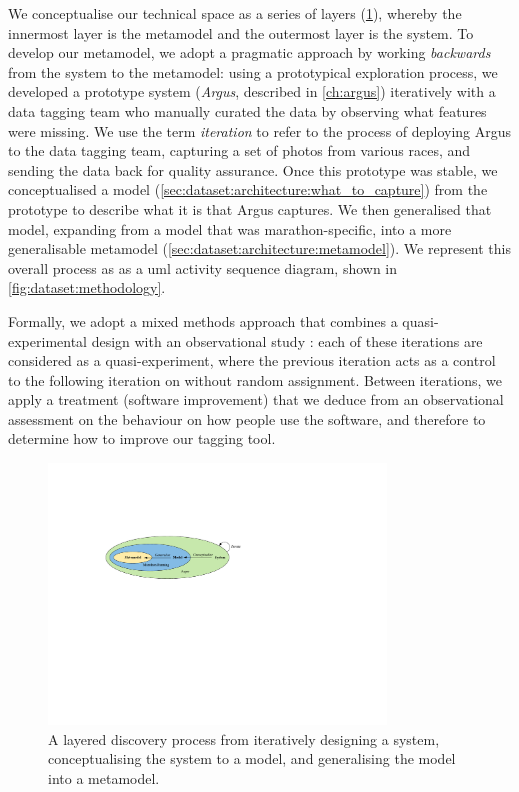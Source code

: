 We conceptualise our technical space as a series of layers (\cref{fig:dataset:layers}), whereby the innermost layer is the metamodel and the outermost layer is the system. To develop our metamodel, we adopt a pragmatic approach by working \textit{backwards} from the system to the metamodel: using a prototypical exploration process, we developed a prototype system (\textit{Argus}, described in \cref{ch:argus}) iteratively with a data tagging team who manually curated the data by observing what features were missing. We use the term \textit{iteration} to refer to the process of deploying Argus to the data tagging team, capturing a set of photos from various races, and sending the data back for quality assurance. Once this prototype was stable, we conceptualised a model (\cref{sec:dataset:architecture:what_to_capture}) from the prototype to describe what it is that Argus captures. We then generalised that model, expanding from a model that was marathon-specific, into a more generalisable metamodel (\cref{sec:dataset:architecture:metamodel}). We represent this overall process as as a \gls{uml} activity sequence diagram, shown in \cref{fig:dataset:methodology}.

Formally, we adopt a mixed methods approach that combines a quasi-experimental design with an observational study \citep{Trochim:2001wg,Gray:2013va}: each of these iterations are considered as a quasi-experiment, where the previous iteration acts as a control to the following iteration on without random assignment. Between iterations, we apply a treatment (software improvement) that we deduce from an observational assessment on the behaviour on how people use the software, and therefore to determine how to improve our tagging tool.

\begin{figure}[h]
  \centering
  \includegraphics[width=0.8\textwidth]{images/dataset/layers}
  \caption[A layered approach to develop our metamodel]{A layered discovery process from iteratively designing a system, conceptualising the system to a model, and generalising the model into a metamodel.}
  \label{fig:dataset:layers}
\end{figure}

